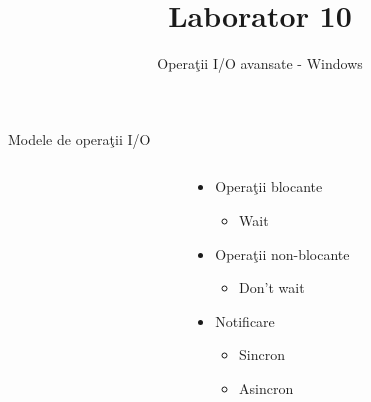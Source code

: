 \documentclass{so.cs.pub.ro}
\title[Laborator 10]{Laborator 10}
\subtitle{Operaţii I/O avansate - Windows}
\begin{document}
\frame{\titlepage}



\begin{frame}{Modele de operaţii I/O}
\begin{columns}
  \begin{column}[1]{0.55\textwidth}
  \end{column}
  \begin{column}[1]{0.45\textwidth}
    \begin{itemize}    %
    \item Operaţii blocante
    \begin{itemize}
        \item Wait
     \end{itemize}
    \item Operaţii non-blocante
    \begin{itemize}
	\item Don't wait
    \end{itemize}
\vspace*{0.2cm}
    \item Notificare
    \begin{itemize}
	\item Sincron
	\item Asincron
    \end{itemize}
    \end{itemize}
  \end{column}
\end{columns}
\end{frame}
\end{document}
